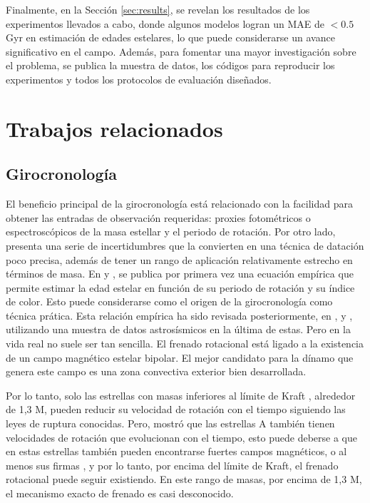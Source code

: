 Finalmente, en la Sección \ref{sec:results}, se revelan los resultados de los experimentos llevados a cabo, donde algunos modelos logran un MAE de $<0.5$ Gyr en estimación de edades estelares, lo que puede considerarse un avance significativo en el campo. Además, para fomentar una mayor investigación sobre el problema, se publica la muestra de datos, los códigos para reproducir los experimentos y todos los protocolos de evaluación diseñados. 

 

\chapter{Trabajos relacionados} 
\label{sec:related_work}

\section{Girocronología}
El beneficio principal de la girocronología está relacionado con la facilidad para obtener las entradas de observación requeridas: proxies fotométricos o espectroscópicos de la masa estellar y el periodo de rotación. Por otro lado, presenta una serie de incertidumbres que la convierten en una técnica de datación poco precisa, además de tener un rango de aplicación relativamente estrecho en términos de masa. En \cite{Barnes03} y \cite{Barnes07}, se publica por primera vez una ecuación empírica que permite estimar la edad estelar en función de su periodo de rotación y su índice de color. Esto puede considerarse como el origen de la girocronología como técnica prática. Esta relación empírica ha sido revisada posteriormente, en \cite{MH}, \cite{Barnes10} y \cite{Angus15}, utilizando una muestra de datos astrosísmicos en la última de estas. Pero en la vida real no suele ser tan sencilla. El frenado rotacional está ligado a la existencia de un campo magnético estelar bipolar. El mejor candidato para la dínamo que genera este campo es una zona convectiva exterior bien desarrollada.

Por lo tanto, solo las estrellas con masas inferiores al límite de Kraft \cite{Kraft67}, alrededor de 1,3 M, pueden reducir su velocidad de rotación con el tiempo siguiendo las leyes de ruptura conocidas. Pero, \cite{Zorec12} mostró que las estrellas A también tienen velocidades de rotación que evolucionan con el tiempo, esto puede deberse a que en estas estrellas también pueden encontrarse fuertes campos magnéticos, o al menos sus firmas \cite{Balona17}, y por lo tanto, por encima del límite de Kraft, el frenado rotacional puede seguir existiendo. En este rango de masas, por encima de 1,3 M, el mecanismo exacto de frenado es casi desconocido.

